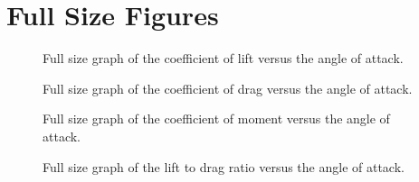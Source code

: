 \newpage

\section{Full Size Figures} \label{sec:full_size_figures}

\begin{figure}[htpb]
    \centering
    
    \caption{Full size graph of the coefficient of lift versus the angle of attack.}
    \label{fig:full_c_l_vs_alpha}
\end{figure}

\begin{figure}[htpb]
    \centering
    
    \caption{Full size graph of the coefficient of drag versus the angle of attack.}
    \label{fig:full_c_d_vs_alpha}
\end{figure}

\begin{figure}[htpb]
    \centering
    
    \caption{Full size graph of the coefficient of moment versus the angle of attack.}
    \label{fig:full_c_m_vs_alpha}
\end{figure}

\begin{figure}[htpb]
    \centering
    
    \caption{Full size graph of the lift to drag ratio versus the angle of attack.}
    \label{fig:full_c_lbyc_d_vs_alpha}
    \vspace*{4.5in}
\end{figure}



